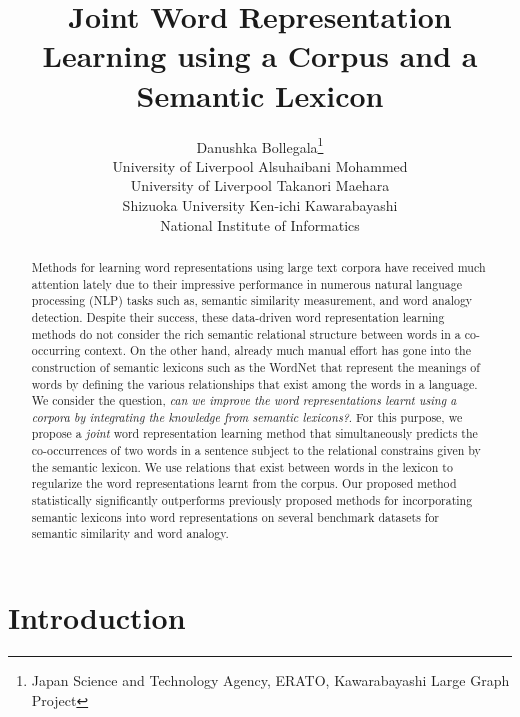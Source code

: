 \documentclass[letterpaper]{article}
\begin{document}
\title{Joint Word  Representation Learning using a Corpus and a Semantic Lexicon}


\author{Danushka Bollegala\thanks{Japan Science and Technology Agency, ERATO, Kawarabayashi Large Graph Project} \\ University of Liverpool \And
Alsuhaibani Mohammed \\ University of Liverpool \And
Takanori Maehara\footnotemark[1] \\
Shizuoka University  \And
Ken-ichi Kawarabayashi\footnotemark[1] \\
National Institute of Informatics}


\maketitle
\begin{abstract}
Methods for learning word representations using large text corpora have received much attention lately due to their impressive performance
in numerous natural language processing (NLP) tasks such as, semantic similarity measurement, and word analogy detection.
Despite their success, these data-driven word representation learning methods do not consider
the rich semantic relational structure between words in a co-occurring context.
On the other hand, already much manual effort has gone into the construction of semantic lexicons such as the WordNet
that represent the meanings of words by defining the various relationships that exist among the words in a language.
We consider the question, \emph{can we improve the word representations learnt using a corpora by integrating the
knowledge from semantic lexicons?}. For this purpose, we propose a \emph{joint} word representation learning method that simultaneously predicts
the co-occurrences of two words in a sentence subject to the relational constrains given by the semantic lexicon.
We use relations that exist between words in the lexicon to regularize the word representations learnt from the corpus.
Our proposed method statistically significantly outperforms previously proposed methods for incorporating semantic lexicons into word
representations on several benchmark datasets for semantic similarity and word analogy.
\end{abstract}

\section{Introduction}
\label{sec:intro}
\end{document}
